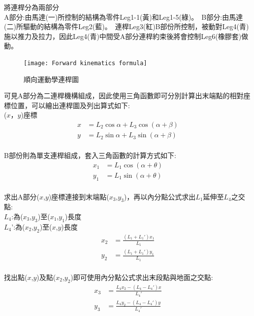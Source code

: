 將連桿分為兩部分\\
A部分:由馬達(一)所控制的結構為零件Leg1-1(黃)和Leg1-5(綠)。\
B部分:由馬達(二)所驅動的結構為零件Leg2(藍)。\
連桿Leg3(紅)B部份所控制，被動對Leg4(青)施以推力及拉力，因此Leg4(青)中間受A部分連桿約束後將會控制Leg6(橡膠套)做動。\\
\begin{figure}[hbt!]
\begin{center}
\texttt{[image: Forward kinematics formula]}
\caption{\Large 順向運動學連桿圖}\label{Forward kinematics formula}
\end{center}
\end{figure}

可見A部分為二連桿機構組成，因此使用三角函數即可分別計算出末端點的相對座標位置，可以繪出連桿圖及列出算式如下:\\
($x$，$y$)座標
\[
\begin{aligned}
x&=L_{2}\cos \alpha +L_{3}\cos \left( \alpha +\beta \right)\\
y&=L_{2}\sin \alpha +L_{3}\sin \left( \alpha +\beta \right)\\
\end{aligned}
\]

B部份則為單支連桿組成，套入三角函數的計算方式如下:\
\[
\begin{aligned}
x_{1}&=L_{1}\cos \left( \alpha +\theta \right)\\
y_{1}&=L_{1}\sin \left( \alpha +\theta \right)\\
\end{aligned}
\]

求出A部分($x$,$y$)座標連接到末端點($x_3$,$y_3$)，再以內分點公式求出$L_1$延伸至$L_4$之交點:\\
$L_4$:為($x_3$,$y_3$)至($x_1$,$y_1$)長度\\
$L_4$':為($x_2$,$y_2$)至($x$,$y$)長度\\

\[
\begin{aligned}
x_{2}&= \frac{\left (L_{1} + L_{1}' \right) x_{1}}{L_{1}}\\
y_{2}&= \frac{\left (L_{1} + L_{1}' \right) y_{1}}{L_{1}}\\
\end{aligned}
\]

找出點($x$,$y$)及點($x_2$,$y_2$)即可使用內分點公式求出末段點與地面之交點:\\

\[
\begin{aligned}
x_{3}&= \frac{L_{4} x_{2} - \left (L_{4} - L_{4}' \right) x}{L_{4}'}\\
y_{3}&= \frac{L_{4} y_{2} - \left (L_{4} - L_{4}' \right) y}{L_{4}'}\\
\end{aligned}
\]

